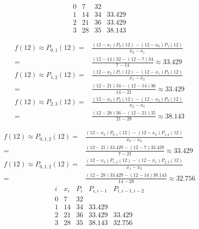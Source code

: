 \documentclass{exam}
\begin{document}
\begin{enumerate}
\begin{enumerate}
\begin{minipage}{0.2\textwidth}
\begin{equation*}
\begin{array}{cccc}
                0 & 7   & 32\\
                1 & 14  & 34 & 33.429\\
                2 & 21  & 36 & 33.429\\
                3 & 28  & 35 & 38.143
            \end{array}
        \end{equation*}
        \end{minipage}
        \begin{minipage}{0.8\textwidth} 
            \begin{align*}
                f(12) \approx P_{0,1}(12) =& \frac{(12-x_1)P_0(12)-(12-x_0)P_1(12)}{x_0-x_1}\\
                =&\frac{(12-14)32-(12-7)34}{7-14}\approx 33.429\\
                f(12) \approx P_{1,2}(12) =& \frac{(12-x_2)P_1(12)-(12-x_1)P_2(12)}{x_1-x_2}\\
                =&\frac{(12-21)34-(12-14)36}{14-21}\approx 33.429\\
                f(12) \approx P_{2,3}(12) =& \frac{(12-x_3)P_2(12)-(12-x_2)P_3(12)}{x_2-x_3}\\
                =&\frac{(12-28)36-(12-21)35}{21-28}\approx 38.143
            \end{align*}
        \end{minipage}
        \begin{align*}
            f(12) \approx P_{0,1,2}(12) =& \frac{(12-x_2)P_{0,1}(12)-(12-x_0)P_{1,2}(12)}{x_0-x_2}\\
            =& \frac{(12-21)33.429-(12-7)33.429}{7-21}\approx 33.429\\
            f(12) \approx P_{0,1,2}(12) =& \frac{(12-x_3)P_{1,2}(12)-(12-x_1)P_{2,3}(12)}{x_1-x_3}\\
            =&\frac{(12-28)33.429-(12-14)38.143}{14-28}\approx 32.756
        \end{align*}
        \begin{equation*}
            \begin{array}{ccccc}
                i & x_i & P_i & P_{i,i-1} & P_{i,i-1,i-2}\\\hline
                0 & 7   & 32\\
                1 & 14  & 34  & 33.429\\
                2 & 21  & 36  & 33.429    & 33.429\\
                3 & 28  & 35  & 38.143    & 32.756
            \end{array}

\end{equation*}
\end{enumerate}
\end{enumerate}
\end{document}

